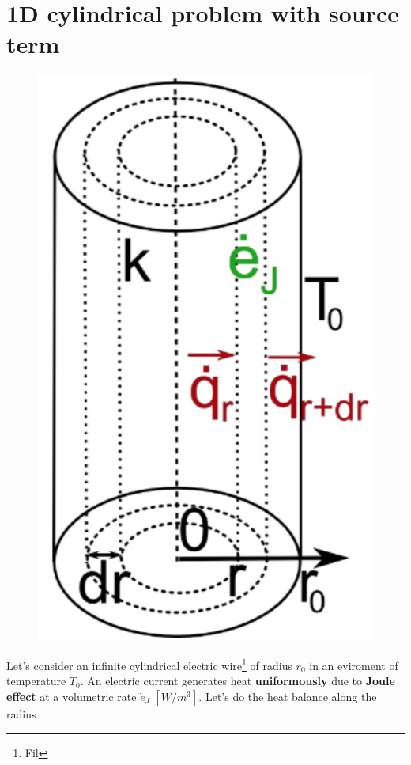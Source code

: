\section{1D cylindrical problem with source term}
	\begin{figure}
 	\vspace{-5mm}
 	\includegraphics[scale=0.2]{ch3/11}
 	\end{figure}
	Let's consider an infinite cylindrical electric wire\footnote{Fil} of radius $r_0$ in an eviroment of temperature $T_0$. An electric current generates heat \textbf{uniformously} due to \textbf{Joule effect} at a volumetric rate $\dot{e}_J$ $[W/m^3]$. Let's do the heat balance along the radius
